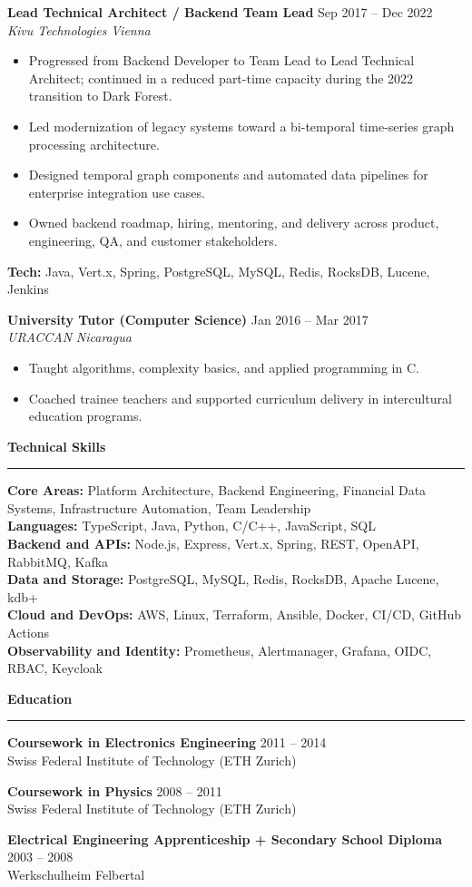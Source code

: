 \documentclass[11pt,a4paper]{article}
\newcommand{\sectionspacebefore}{1.05em}
\newcommand{\sectionspacetoline}{-0.12em}
\newcommand{\sectionspacetocontent}{0.58em}
\newcommand{\roleblockgap}{0.65em}
\newcommand{\cvsection}[1]{
  \par\vspace{\sectionspacebefore}
  {\large\bfseries\color{black}#1}\par
  \vspace{\sectionspacetoline}
  \noindent\rule{\textwidth}{0.45pt}\par
  \vspace{\sectionspacetocontent}
}
\newcommand{\role}[4]{
  \textbf{#1} \hfill #2\\
  \textit{#3} \hfill \textit{#4}
  \vspace{0.25em}
}
\begin{document}
\vspace{\roleblockgap}
\role{Lead Technical Architect / Backend Team Lead}{Sep 2017 -- Dec 2022}{Kivu Technologies}{Vienna}
\begin{itemize}
  \item Progressed from Backend Developer to Team Lead to Lead Technical Architect; continued in a reduced part-time capacity during the 2022 transition to Dark Forest.
  \item Led modernization of legacy systems toward a bi-temporal time-series graph processing architecture.
  \item Designed temporal graph components and automated data pipelines for enterprise integration use cases.
  \item Owned backend roadmap, hiring, mentoring, and delivery across product, engineering, QA, and customer stakeholders.
\end{itemize}
\textbf{Tech:} Java, Vert.x, Spring, PostgreSQL, MySQL, Redis, RocksDB, Lucene, Jenkins

\vspace{\roleblockgap}
\role{University Tutor (Computer Science)}{Jan 2016 -- Mar 2017}{URACCAN}{Nicaragua}
\begin{itemize}
  \item Taught algorithms, complexity basics, and applied programming in C.
  \item Coached trainee teachers and supported curriculum delivery in intercultural education programs.
\end{itemize}

\cvsection{Technical Skills}
\textbf{Core Areas:} Platform Architecture, Backend Engineering, Financial Data Systems, Infrastructure Automation, Team Leadership\\
\textbf{Languages:} TypeScript, Java, Python, C/C++, JavaScript, SQL\\
\textbf{Backend and APIs:} Node.js, Express, Vert.x, Spring, REST, OpenAPI, RabbitMQ, Kafka\\
\textbf{Data and Storage:} PostgreSQL, MySQL, Redis, RocksDB, Apache Lucene, kdb+\\
\textbf{Cloud and DevOps:} AWS, Linux, Terraform, Ansible, Docker, CI/CD, GitHub Actions\\
\textbf{Observability and Identity:} Prometheus, Alertmanager, Grafana, OIDC, RBAC, Keycloak

\cvsection{Education}
\textbf{Coursework in Electronics Engineering} \hfill 2011 -- 2014\\
Swiss Federal Institute of Technology (ETH Zurich)

\vspace{0.35em}
\textbf{Coursework in Physics} \hfill 2008 -- 2011\\
Swiss Federal Institute of Technology (ETH Zurich)

\vspace{0.35em}
\textbf{Electrical Engineering Apprenticeship + Secondary School Diploma} \hfill 2003 -- 2008\\
Werkschulheim Felbertal
\end{document}
